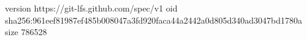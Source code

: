 version https://git-lfs.github.com/spec/v1
oid sha256:961eef81987ef485b008047a3fd920faca44a2442a0d805d340ad3047bd1780a
size 786528
